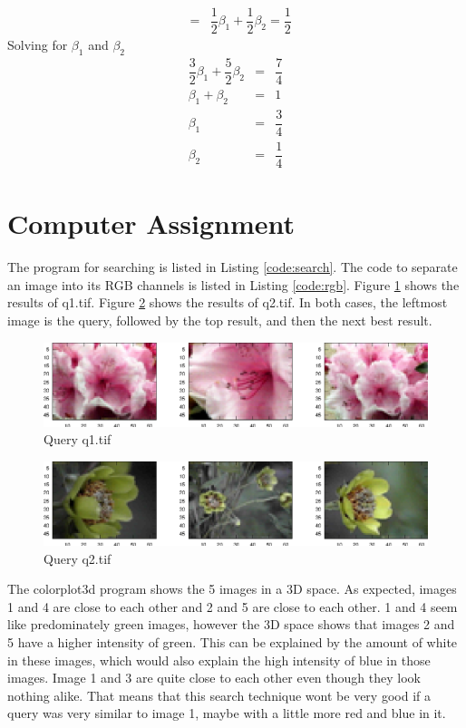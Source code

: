 \documentclass[10pt, a4paper]{article}
\begin{document}
\begin{enumerate}
\begin{eqnarray}
      &=& \dfrac{1}{2}\beta_1 + \dfrac{1}{2}\beta_2 = \dfrac{1}{2}
    \end{eqnarray}
    Solving for $\beta_1$ and $\beta_2$
    \begin{eqnarray}
      \dfrac{3}{2}\beta_1 + \dfrac{5}{2}\beta_2 &=& \dfrac{7}{4} \\  
      \beta_1 + \beta_2 &=& 1 \\
      \beta_1 &=& \dfrac{3}{4} \\
      \beta_2 &=& \dfrac{1}{4}
    \end{eqnarray}
\end{enumerate}

\section{Computer Assignment}
The program for searching is listed in Listing \ref{code:search}. The code to separate an image into
its RGB channels is listed in Listing \ref{code:rgb}. Figure \ref{fig:q1} shows the results of q1.tif.
Figure \ref{fig:q2} shows the results of q2.tif. In both cases, the leftmost image is the query, followed
by the top result, and then the next best result.

\begin{figure}[h!]
  \centering
  \includegraphics{../data/0.eps}
  \caption{Query q1.tif}
  \label{fig:q1}
\end{figure}

\begin{figure}[h!]
  \centering
  \includegraphics{../data/1.eps}
  \caption{Query q2.tif}
  \label{fig:q2}
\end{figure}

The colorplot3d program shows the 5 images in a 3D space. As expected, images 1 and 4 are close to each other
and 2 and 5 are close to each other. 1 and 4 seem like predominately green images, however the 3D space shows
that images 2 and 5 have a higher intensity of green. This can be explained by the amount of white in these 
images, which would also explain the high intensity of blue in those images. Image 1 and 3 are quite close to
each other even though they look nothing alike. That means that this search technique wont be very good if a
query was very similar to image 1, maybe with a little more red and blue in it. 
\end{document}
